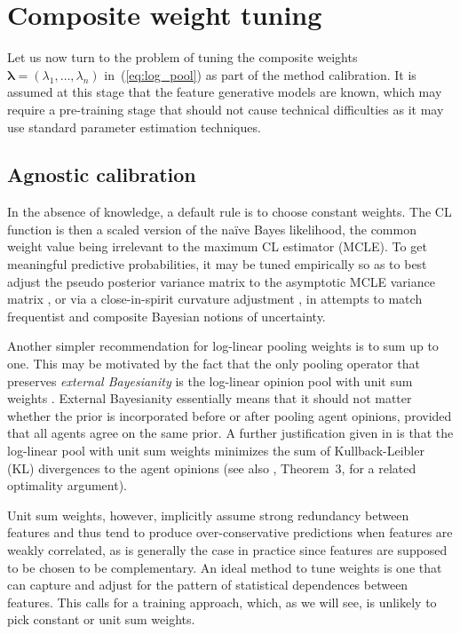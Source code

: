 \documentclass[english]{scrartcl}
\newcommand{\lda}{{\boldsymbol{\lambda}}}
\begin{document}
\section{Composite weight tuning}
\label{sec:weight_tuning}


Let us now turn to the problem of tuning the composite weights~$\lda=(\lambda_1,\ldots,\lambda_n)$ in~(\ref{eq:log_pool}) as part of the method calibration. It is assumed at this stage that the feature generative models are known, which may require a pre-training stage that should not cause technical difficulties as it may use standard parameter estimation techniques. 


\subsection{Agnostic calibration}

In the absence of knowledge, a default rule is to choose constant weights. The CL function is then a scaled version of the na\"ive Bayes likelihood, the common weight value being irrelevant to the maximum CL estimator (MCLE). To get meaningful predictive probabilities, it may be tuned empirically so as to best adjust the pseudo posterior variance matrix to the asymptotic MCLE variance matrix \cite{Pauli-11}, or via a close-in-spirit curvature adjustment \cite{Ribatet-12}, in attempts to match frequentist and composite Bayesian notions of uncertainty.

Another simpler recommendation for log-linear pooling weights is to sum up to one. This may be motivated by the fact that the only pooling operator that preserves {\em external Bayesianity} is the log-linear opinion pool with unit sum weights \cite{Genest-86b}. External Bayesianity essentially means that it should not matter whether the prior is incorporated before or after pooling agent opinions, provided that all agents agree on the same prior. A further justification given in \cite{Garg-04} is that the log-linear pool with unit sum weights minimizes the sum of Kullback-Leibler (KL) divergences to the agent opinions (see also \cite{Wang-14}, Theorem~3, for a related optimality argument).

Unit sum weights, however, implicitly assume strong redundancy between features and thus tend to produce over-conservative predictions when features are weakly correlated, as is generally the case in practice since features are supposed to be chosen to be complementary. An ideal method to tune weights is one that can capture and adjust for the pattern of statistical dependences between features. This calls for a training approach, which, as we will see, is unlikely to pick constant or unit sum weights.
\end{document}
